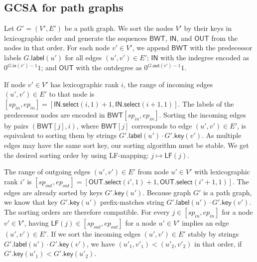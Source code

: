 \documentclass[a4paper,11pt]{llncs}
\newcommand{\select}{\ensuremath{\mathsf{select}}}
\newcommand{\LF}{\ensuremath{\mathsf{LF}}}
\newcommand{\gindegree}{\ensuremath{\mathsf{in}}}
\newcommand{\goutdegree}{\ensuremath{\mathsf{out}}}
\newcommand{\glabel}{\ensuremath{\mathsf{label}}}
\newcommand{\gkey}{\ensuremath{\mathsf{key}}}
\newcommand{\LFmapping}{LF\nobreakdash-mapping}
\newcommand{\BWT}{\ensuremath{\mathsf{BWT}}}
\newcommand{\bvIN}{\ensuremath{\mathsf{IN}}}
\newcommand{\bvOUT}{\ensuremath{\mathsf{OUT}}}
\begin{document}
\subsection{GCSA for path graphs}

Let $G' = (V', E')$ be a path graph. We sort the nodes $V'$ by their keys in lexicographic order and generate the sequences $\BWT$, $\bvIN$, and $\bvOUT$ from the nodes in that order. For each node $v' \in V'$, we append $\BWT$ with the predecessor labels $G.\glabel(u')$ for all edges $(u', v') \in E'$; $\bvIN$ with the indegree encoded as $0^{G.\gindegree(v')-1} 1$; and $\bvOUT$ with the outdegree as $0^{G.\goutdegree(v')-1} 1$.

If node $v' \in V'$ has lexicographic rank $i$, the range of incoming edges $(u', v') \in E'$ to that node is $[sp_{in}, ep_{in}] = [\bvIN.\select(i, 1) + 1, \bvIN.\select(i+1, 1)]$. The labels of the predecessor nodes are encoded in $\BWT[sp_{in}, ep_{in}]$. Sorting the incoming edges by pairs $(\BWT[j], i)$, where $\BWT[j]$ corresponds to edge $(u', v') \in E'$, is equivalent to sorting them by strings $G'.\glabel(u') \cdot G'.\gkey(v')$. As multiple edges may have the same sort key, our sorting algorithm must be stable. We get the desired sorting order by using \LFmapping: $j \mapsto \LF(j)$.

The range of outgoing edges $(u', v') \in E'$ from node $u' \in V'$ with lexicographic rank $i'$ is $[sp_{out}, ep_{out}] = [\bvOUT.\select(i', 1) + 1, \bvOUT.\select(i'+1, 1)]$. The edges are already sorted by keys $G'.\gkey(u')$. Because graph $G'$ is a path graph, we know that key $G'.\gkey(u')$ prefix-matches string $G'.\glabel(u') \cdot G'.\gkey(v')$. The sorting orders are therefore compatible. For every $j \in [sp_{in}, ep_{in}]$ for a node $v' \in V'$, having $\LF(j) \in [sp_{out}, ep_{out}]$ for a node $u' \in V'$ implies an edge $(u', v') \in E'$. If we sort the incoming edges $(u', v') \in E'$ stably by strings $G'.\glabel(u') \cdot G'.\gkey(v')$, we have $(u'_{1}, v'_{1}) < (u'_{2}, v'_{2})$ in that order, if $G'.\gkey(u'_{1}) < G'.\gkey(u'_{2})$.
\end{document}
